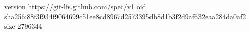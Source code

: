 version https://git-lfs.github.com/spec/v1
oid sha256:88f3f934f9064699c51ee8cd8967d2573395db8d1b3f2d9af632eaa284da0af2
size 2796344
